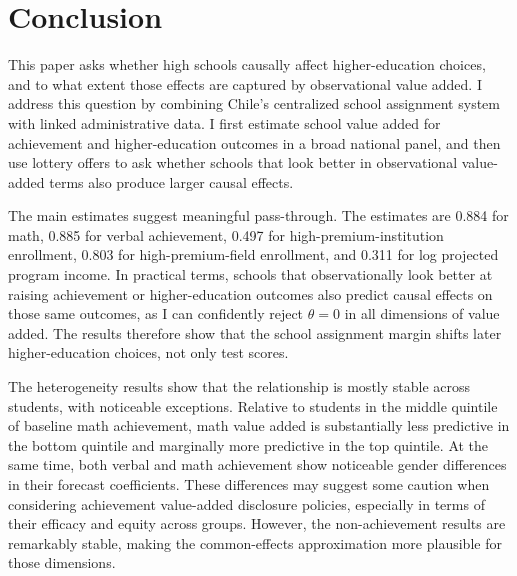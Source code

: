 \documentclass[a4paper, article, english, oneside, unknownkeysallowed, 12pt]{memoir}
\begin{document}
\clearpage 
\section{Conclusion}

This paper asks whether high schools causally affect higher-education choices, and to what extent those effects are captured by observational value added.
I address this question by combining Chile's centralized school assignment system with linked administrative data.
I first estimate school value added for achievement and higher-education outcomes in a broad national panel, and then use lottery offers to ask whether schools that look better in observational value-added terms also produce larger causal effects.

The main estimates suggest meaningful pass-through.
The estimates are 0.884 for math, 0.885 for verbal achievement, 0.497 for high-premium-institution enrollment, 0.803 for high-premium-field enrollment, and 0.311 for log projected program income.
In practical terms, schools that observationally look better at raising achievement or higher-education outcomes also predict causal effects on those same outcomes, as I can confidently reject $\theta = 0$ in all dimensions of value added.
The results therefore show that the school assignment margin shifts later higher-education choices, not only test scores.

The heterogeneity results show that the relationship is mostly stable across students, with noticeable exceptions.
Relative to students in the middle quintile of baseline math achievement, math value added is substantially less predictive in the bottom quintile and marginally more predictive in the top quintile.
At the same time, both verbal and math achievement show noticeable gender differences in their forecast coefficients.
These differences may suggest some caution when considering achievement value-added disclosure policies, especially in terms of their efficacy and equity across groups.
However, the non-achievement results are remarkably stable, making the common-effects approximation more plausible for those dimensions.

\end{document}
